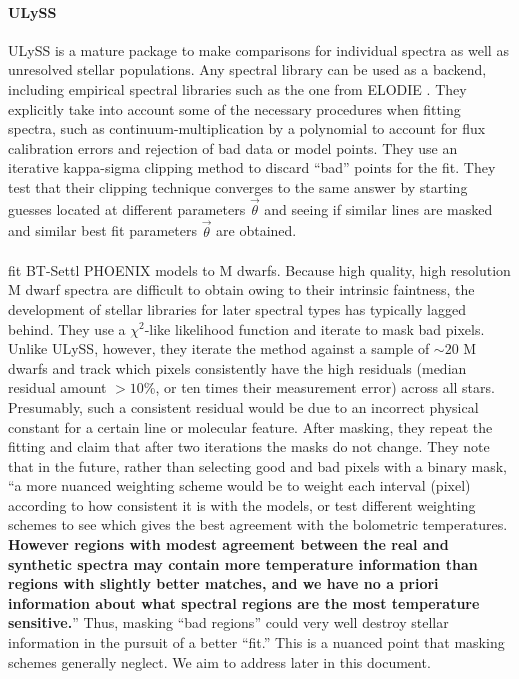 \documentclass[preprint]{aastex} %
\newcommand{\vt}{\vec{\theta}}
\begin{document}
\paragraph{ULySS} ULySS \citep{kpb+09} is a mature package to make comparisons for individual spectra as well as unresolved stellar populations. Any spectral library can be used as a backend, including empirical spectral libraries such as the one from ELODIE \citep{psk+07}. They explicitly take into account some of the necessary procedures when fitting spectra, such as continuum-multiplication by a polynomial to account for flux calibration errors and rejection of bad data or model points. They use an iterative kappa-sigma clipping method to discard ``bad'' points for the fit. They test that their clipping technique converges to the same answer by starting guesses located at different parameters $\vt$ and seeing if similar lines are masked and similar best fit parameters $\vt$ are obtained.

\paragraph{\citet{mga13}} fit BT-Settl PHOENIX models to M dwarfs. Because high quality, high resolution M dwarf spectra are difficult to obtain owing to their intrinsic faintness, the development of stellar libraries for later spectral types has typically lagged behind. They use a $\chi^2$-like likelihood function and iterate to mask bad pixels. Unlike ULySS, however, they iterate the method against a sample of $\sim 20$ M dwarfs and track which pixels consistently have the high residuals (median residual amount $> 10$\%, or ten times their measurement error) across all stars. Presumably, such a consistent residual would be due to an incorrect physical constant for a certain line or molecular feature. After masking, they repeat the fitting and claim that after two iterations the masks do not change. They note that in the future, rather than selecting good and bad pixels with a binary mask, ``a more nuanced weighting scheme would be to weight each interval (pixel) according to how consistent it is with the models, or test different weighting schemes to see which gives the best agreement with the bolometric temperatures. \textbf{However regions with modest agreement between the real and synthetic spectra may contain more temperature information than regions with slightly better matches, and we have no a priori information about what spectral regions are the most temperature sensitive.}'' Thus, masking ``bad regions'' could very well destroy stellar information in the pursuit of a better ``fit.'' This is a nuanced point that masking schemes generally neglect. We aim to address later in this document.
\end{document}
